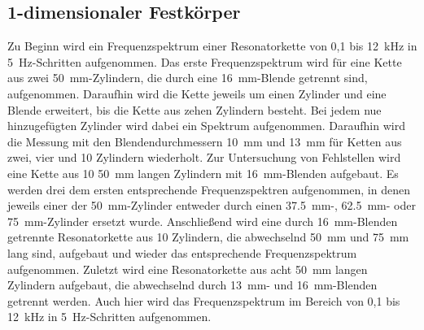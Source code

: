     \subsection{1-dimensionaler Festkörper}
        Zu Beginn wird ein Frequenzspektrum einer Resonatorkette von 0,1 bis \SI{12}{\kilo\hertz} in \SI{5}{\hertz}-Schritten aufgenommen. Das erste Frequenzspektrum wird für eine Kette aus zwei 
        \SI{50}{\milli\metre}-Zylindern, die durch eine \SI{16}{\milli\metre}-Blende getrennt sind, aufgenommen. Daraufhin wird die Kette jeweils um einen Zylinder und eine Blende erweitert, bis die Kette aus 
        zehen Zylindern besteht. Bei jedem nue hinzugefügten Zylinder wird dabei ein Spektrum aufgenommen.\newline
        Daraufhin wird die Messung mit den Blendendurchmessern \SI{10}{\milli\metre} und \SI{13}{\milli\metre} für Ketten aus zwei, vier und 10 Zylindern wiederholt.\newline
        Zur Untersuchung von Fehlstellen wird eine Kette aus 10 \SI{50}{\milli\metre} langen Zylindern mit \SI{16}{\milli\metre}-Blenden aufgebaut. Es werden drei dem ersten entsprechende Frequenzspektren 
        aufgenommen, in denen jeweils einer der \SI{50}{\milli\metre}-Zylinder entweder durch einen \SI{37.5}{\milli\metre}-, \SI{62.5}{\milli\metre}- oder \SI{75}{\milli\metre}-Zylinder ersetzt wurde.\newline
        Anschließend wird eine durch \SI{16}{\milli\metre}-Blenden getrennte Resonatorkette aus 10 Zylindern, die abwechselnd \SI{50}{\milli\metre} und \SI{75}{\milli\metre} lang sind, aufgebaut und wieder 
        das entsprechende Frequenzspektrum aufgenommen.\newline
        Zuletzt wird eine Resonatorkette aus acht \SI{50}{\milli\metre} langen Zylindern aufgebaut, die abwechselnd durch \SI{13}{\milli\metre}- und \SI{16}{\milli\metre}-Blenden getrennt werden. Auch hier 
        wird das Frequenzspektrum im Bereich von 0,1 bis \SI{12}{\kilo\hertz} in \SI{5}{\hertz}-Schritten aufgenommen.


        
        

        

